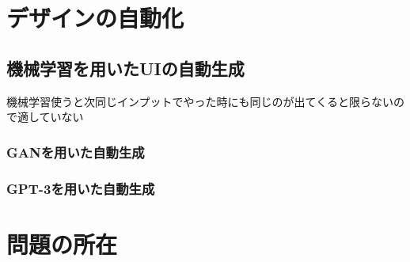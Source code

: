 %
%
%

\section{デザインの自動化}
\subsection{機械学習を用いたUIの自動生成}
機械学習使うと次同じインプットでやった時にも同じのが出てくると限らないので適していない
\subsubsection{GANを用いた自動生成}

\subsubsection{GPT-3を用いた自動生成}

\section{問題の所在}

